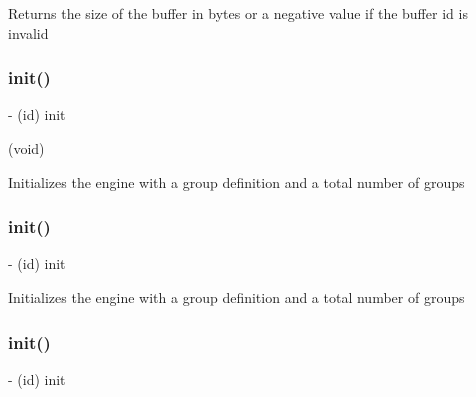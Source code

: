 Returns the size of the buffer in bytes or a negative value if the buffer id is invalid \mbox{\label{interfaceCDSoundEngine_a013cb9b6cf86c0dbfca8fac6aae0bd6a}} 
\subsubsection{\texorpdfstring{init()}{init()}\hspace{0.1cm}{\footnotesize\ttfamily [1/4]}}
{\footnotesize\ttfamily -\/ (id) init \begin{DoxyParamCaption}\item[{(void)}]{ }\end{DoxyParamCaption}}

Initializes the engine with a group definition and a total number of groups \mbox{\label{interfaceCDSoundEngine_a013cb9b6cf86c0dbfca8fac6aae0bd6a}} 
\subsubsection{\texorpdfstring{init()}{init()}\hspace{0.1cm}{\footnotesize\ttfamily [2/4]}}
{\footnotesize\ttfamily -\/ (id) init \begin{DoxyParamCaption}{ }\end{DoxyParamCaption}}

Initializes the engine with a group definition and a total number of groups \mbox{\label{interfaceCDSoundEngine_a013cb9b6cf86c0dbfca8fac6aae0bd6a}} 
\subsubsection{\texorpdfstring{init()}{init()}\hspace{0.1cm}{\footnotesize\ttfamily [3/4]}}
{\footnotesize\ttfamily -\/ (id) init \begin{DoxyParamCaption}{ }\end{DoxyParamCaption}}

